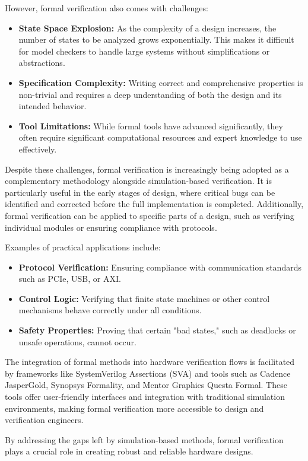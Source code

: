 \documentclass[12pt]{report}
\begin{document}
However, formal verification also comes with challenges:
\begin{itemize}
  \item \textbf{State Space Explosion:} As the complexity of a design increases, the number of states to be analyzed
    grows exponentially. This makes it difficult for model checkers to handle large systems without simplifications
    or abstractions.
  \item \textbf{Specification Complexity:} Writing correct and comprehensive properties is non-trivial and requires a
    deep understanding of both the design and its intended behavior.
  \item \textbf{Tool Limitations:} While formal tools have advanced significantly, they often require significant
    computational resources and expert knowledge to use effectively.
\end{itemize}

Despite these challenges, formal verification is increasingly being adopted as a complementary methodology alongside
simulation-based verification. It is particularly useful in the early stages of design, where critical bugs can be
identified and corrected before the full implementation is completed. Additionally, formal verification can be
applied to specific parts of a design, such as verifying individual modules or ensuring compliance with protocols.

Examples of practical applications include:
\begin{itemize}
  \item \textbf{Protocol Verification:} Ensuring compliance with communication standards such as PCIe, USB, or AXI.
  \item \textbf{Control Logic:} Verifying that finite state machines or other control mechanisms behave correctly
    under all conditions.
  \item \textbf{Safety Properties:} Proving that certain "bad states," such as deadlocks or unsafe operations, cannot occur.
\end{itemize}

The integration of formal methods into hardware verification flows is facilitated by frameworks like SystemVerilog
Assertions (SVA) and tools such as Cadence JasperGold, Synopsys Formality, and Mentor Graphics Questa Formal. These
tools offer user-friendly interfaces and integration with traditional simulation environments, making formal
verification more accessible to design and verification engineers.

By addressing the gaps left by simulation-based methods, formal verification plays a crucial role in creating robust
and reliable hardware designs.
\end{document}
